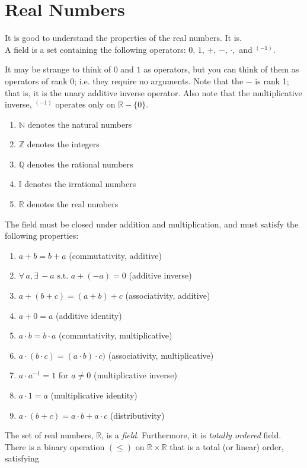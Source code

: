 \documentclass[12pt]{report}
\newcommand{\define}{  \noindent{\sc Definition }\hspace{5pt} }
\newcommand{\fall}{\forall\,}
\newcommand{\exst}{\exists\,}
\newcommand{\st}{\textrm{ s.t. }}
\newcommand{\reals}{\mathbb{R}}
\newcommand{\naturals}{\mathbb{N}}
\newcommand{\rationals}{\mathbb{Q}}
\newcommand{\integers}{\mathbb{Z}}
\newcommand{\irrationals}{\mathbb{I}}
\begin{document}
\chapter{Real Numbers}

It is good to understand the properties of the real numbers. It is.\\

\define A field is a set containing the following operators:
$0,\, 1,\, +,\, -,\, \cdot,$ and $^{(-1)} $. 

It may be strange to think of $0$ and $1$ as operators, but you can think of
them as operators of rank 0; i.e. they require no arguments. Note that the $-$
is rank 1; that is, it is the unary additive inverse operator. Also note that the multiplicative inverse, $^{(-1)}$ operates only on $\reals - \{0\}$.
\begin{enumerate}
\item $\naturals$ denotes the natural numbers
\item $\integers$ denotes the integers
\item $\rationals$ denotes the rational numbers
\item $\irrationals$ denotes the irrational numbers
\item $\reals$ denotes the real numbers
\end{enumerate}
The field must be
closed under addition and multiplication, and must satisfy the following
properties:
\begin{enumerate}
\item $a + b = b + a$ (commutativity, additive)
\item $\fall a, \exst -a \st a + (-a) = 0$ (additive inverse)
\item $a + (b + c) = (a + b) + c$ (associativity, additive)
\item $a + 0 = a$ (additive identity)
\item $a \cdot b = b \cdot a$ (commutativity, multiplicative)
\item $a \cdot (b \cdot c) = (a \cdot b) \cdot c)$ (associativity,
multiplicative)
\item $a \cdot a^{-1} = 1 $ for $a \neq 0$ (multiplicative inverse)
\item $a \cdot 1 = a$ (multiplicative identity)
\item $a \cdot (b + c) = a \cdot b + a \cdot c$ (distributivity)
\end{enumerate}

The set of real numbers, $\reals$, is a {\em field}. Furthermore, it is {\em
totally ordered} field. There is a binary operation $(\leq)$ on $\reals \times
\reals$ that is a total (or linear) order, satisfying 
\end{document}
